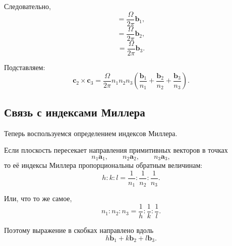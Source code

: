 \documentclass[../final.tex]{subfiles}
\begin{document}
Следовательно,
%
\begin{equation*}
    [\mathbf a_2\times\mathbf a_3]
    =
    \frac{\Omega}{2\pi}\mathbf b_1,
\end{equation*}
%
\begin{equation*}
    [\mathbf a_3\times\mathbf a_1]
    =
    \frac{\Omega}{2\pi}\mathbf b_2,
\end{equation*}
%
\begin{equation*}
    [\mathbf a_1\times\mathbf a_2]
    =
    \frac{\Omega}{2\pi}\mathbf b_3.
\end{equation*}

Подставляем:
%
\begin{equation*}
    \mathbf c_2\times\mathbf c_3
    =
    \frac{\Omega}{2\pi}
    n_1n_2n_3
    \left(
        \frac{\mathbf b_1}{n_1}
        +
        \frac{\mathbf b_2}{n_2}
        +
        \frac{\mathbf b_3}{n_3}
    \right).
\end{equation*}



\subsection*{Связь с индексами Миллера}

Теперь воспользуемся определением индексов Миллера.

Если плоскость пересекает направления примитивных векторов
в точках
%
\begin{equation*}
    n_1\mathbf a_1,
    \qquad
    n_2\mathbf a_2,
    \qquad
    n_3\mathbf a_3,
\end{equation*}
%
то её индексы Миллера пропорциональны обратным величинам:
%
\begin{equation*}
    h:k:l
    =
    \frac{1}{n_1}
    :
    \frac{1}{n_2}
    :
    \frac{1}{n_3}.
\end{equation*}

Или, что то же самое,
%
\begin{equation*}
    n_1:n_2:n_3
    =
    \frac{1}{h}
    :
    \frac{1}{k}
    :
    \frac{1}{l}.
\end{equation*}

Поэтому выражение в скобках направлено вдоль
%
\begin{equation*}
    h\mathbf b_1
    +
    k\mathbf b_2
    +
    l\mathbf b_3.
\end{equation*}
\end{document}

